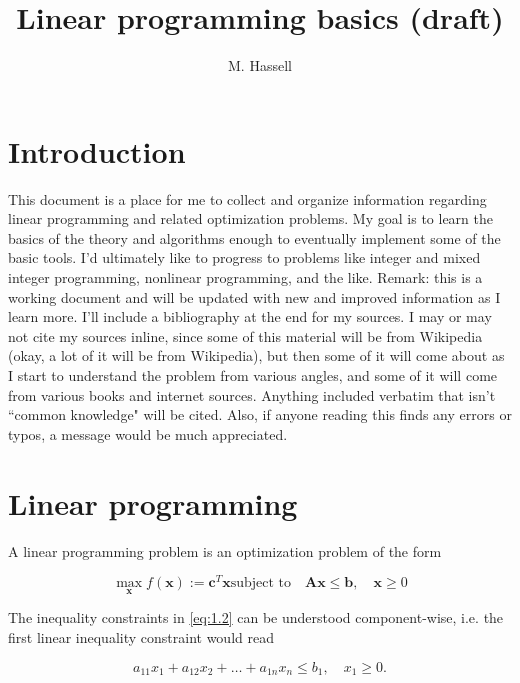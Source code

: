 \documentclass[12pt,english]{article}
\title{Linear programming basics (draft)}
\author{M. Hassell}
\begin{document}
\maketitle

\section{Introduction}\label{sec:1}

This document is a place for me to collect and organize information regarding linear programming and related optimization problems.  My goal is to learn the basics of the theory and algorithms enough to eventually implement some of the basic tools.  I'd ultimately like to progress to problems like integer and mixed integer programming, nonlinear programming, and the like.  Remark: this is a working document and will be updated with new and improved information as I learn more.   I'll include a bibliography at the end for my sources.   I may or may not cite my sources inline, since some of this material will be from Wikipedia (okay, a lot of it will be from Wikipedia), but then some of it will come about as I start to understand the problem from various angles, and some of it will come from various books and internet sources.  Anything included verbatim that isn't ``common knowledge" will be cited.  Also, if anyone reading this finds any errors or typos, a message would be much appreciated.

\section{Linear programming}\label{sec:2}

A linear programming problem is an optimization problem of the form

\begin{subequations}
\begin{equation}\label{eq:1.1}
\max_\mathbf{x} f(\mathbf x)  := \mathbf{c}^T \mathbf{x}
\end{equation}
\begin{equation}\label{eq:1.2}
\text{subject to} \quad \mathbf{A}\mathbf{x} \leq \mathbf{b}, \quad \mathbf{x}\geq 0
\end{equation}
\end{subequations}

The inequality constraints in \eqref{eq:1.2} can be understood component-wise, i.e. the first linear inequality constraint would read

$$
a_{11}x_1 + a_{12}x_2 + \dots + a_{1n}x_n \leq b_1, \quad x_1 \geq 0.
$$
\end{document}
